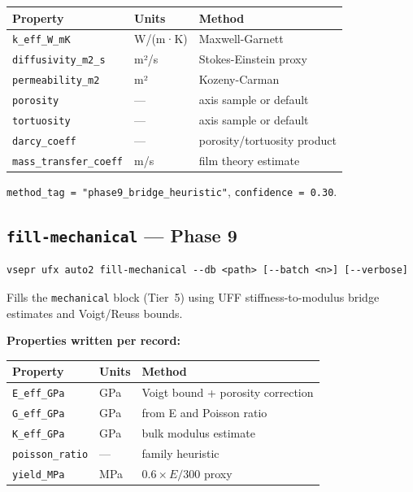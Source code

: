 \documentclass[11pt,letterpaper]{article}
\begin{document}
\begin{center}
\begin{tabular}{lll}
\toprule
Property & Units & Method \\
\midrule
\texttt{k\_eff\_W\_mK}          & W/(m·K) & Maxwell-Garnett \\
\texttt{diffusivity\_m2\_s}     & m²/s    & Stokes-Einstein proxy \\
\texttt{permeability\_m2}       & m²      & Kozeny-Carman \\
\texttt{porosity}               & ---     & axis sample or default \\
\texttt{tortuosity}             & ---     & axis sample or default \\
\texttt{darcy\_coeff}           & ---     & porosity/tortuosity product \\
\texttt{mass\_transfer\_coeff}  & m/s     & film theory estimate \\
\bottomrule
\end{tabular}
\end{center}

\texttt{method\_tag = "phase9\_bridge\_heuristic"}, \texttt{confidence = 0.30}.

\subsection{\texttt{fill-mechanical} --- Phase 9}

\begin{lstlisting}
vsepr ufx auto2 fill-mechanical --db <path> [--batch <n>] [--verbose]
\end{lstlisting}

Fills the \texttt{mechanical} block (Tier~5) using UFF stiffness-to-modulus
bridge estimates and Voigt/Reuss bounds.

\textbf{Properties written per record:}

\begin{center}
\begin{tabular}{lll}
\toprule
Property & Units & Method \\
\midrule
\texttt{E\_eff\_GPa}    & GPa & Voigt bound + porosity correction \\
\texttt{G\_eff\_GPa}    & GPa & from E and Poisson ratio \\
\texttt{K\_eff\_GPa}    & GPa & bulk modulus estimate \\
\texttt{poisson\_ratio} & --- & family heuristic \\
\texttt{yield\_MPa}     & MPa & $0.6 \times E / 300$ proxy \\
\bottomrule
\end{tabular}
\end{center}
\end{document}
